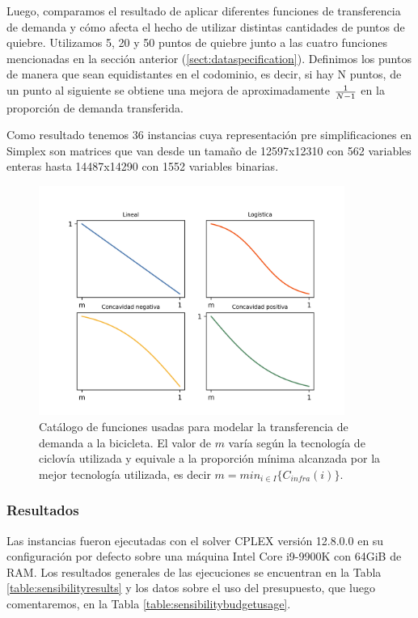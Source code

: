 \documentclass{article}
\begin{document}
  Luego, comparamos el resultado de aplicar diferentes funciones de transferencia de demanda y cómo afecta el hecho de utilizar distintas cantidades de puntos de quiebre. Utilizamos 5, 20 y 50 puntos de quiebre junto a las cuatro funciones mencionadas en la sección anterior (\ref{sect:dataspecification}). Definimos los puntos de manera que sean equidistantes en el codominio, es decir, si hay N puntos, de un punto al siguiente se obtiene una mejora de aproximadamente ${1 \over N - 1}$ en la proporción de demanda transferida.

  Como resultado tenemos 36 instancias cuya representación pre simplificaciones en Simplex son matrices que van desde un tamaño de 12597x12310 con 562 variables enteras hasta 14487x14290 con 1552 variables binarias.

  \begin{figure}[h!]
    \centering
    \includegraphics[width=10cm]{../resources/f_catalog.png}
      \caption{Catálogo de funciones usadas para modelar la transferencia de demanda a la bicicleta. El valor de $m$ varía según la tecnología de ciclovía utilizada y equivale a la proporción mínima alcanzada por la mejor tecnología utilizada, es decir $m = min_{i \in I} \{ C_{infra}(i) \}$.}
    \label{fig:fcatalog}
  \end{figure}

  \FloatBarrier
  \subsubsection{Resultados}

  Las instancias fueron ejecutadas con el solver CPLEX versión 12.8.0.0 en su configuración por defecto sobre una máquina Intel Core i9-9900K con 64GiB de RAM. Los resultados generales de las ejecuciones se encuentran en la Tabla \ref{table:sensibilityresults} y los datos sobre el uso del presupuesto, que luego comentaremos, en la Tabla \ref{table:sensibilitybudgetusage}.
\end{document}
